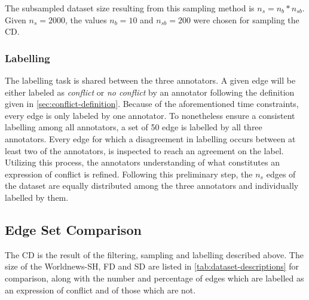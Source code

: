 \documentclass[11pt]{scrreprt}
\begin{document}
The subsampled dataset size resulting from this sampling method is \(n_{s} = n_{b} * n_{sb}\). Given \(n_{s} = 2000\), the values \(n_b = 10\) and \(n_{sb} = 200\) were chosen for sampling the CD.


\subsubsection{Labelling}
The labelling task is shared between the three annotators. A given edge will be either labeled as \textit{conflict} or \textit{no conflict} by an annotator following the definition given in \cref{sec:conflict-definition}. Because of the aforementioned time constraints, every edge is only labeled by one annotator. To nonetheless ensure a consistent labelling among all annotators, a set of 50 edge is labelled by all three annotators. Every edge for which a disagreement in labelling occurs between at least two of the annotators, is inspected to reach an agreement on the label. Utilizing this process, the annotators understanding of what constitutes an expression of conflict is refined. Following this preliminary step, the \(n_s\) edges of the dataset are equally distributed among the three annotators and individually labelled by them.


\subsection{Edge Set Comparison}
The CD is the result of the filtering, sampling and labelling described above. The size of the Worldnews-SH, FD and SD are listed in \cref{tab:dataset-descriptions} for comparison, along with the number and percentage of edges which are labelled as an expression of conflict and of those which are not.
\end{document}
